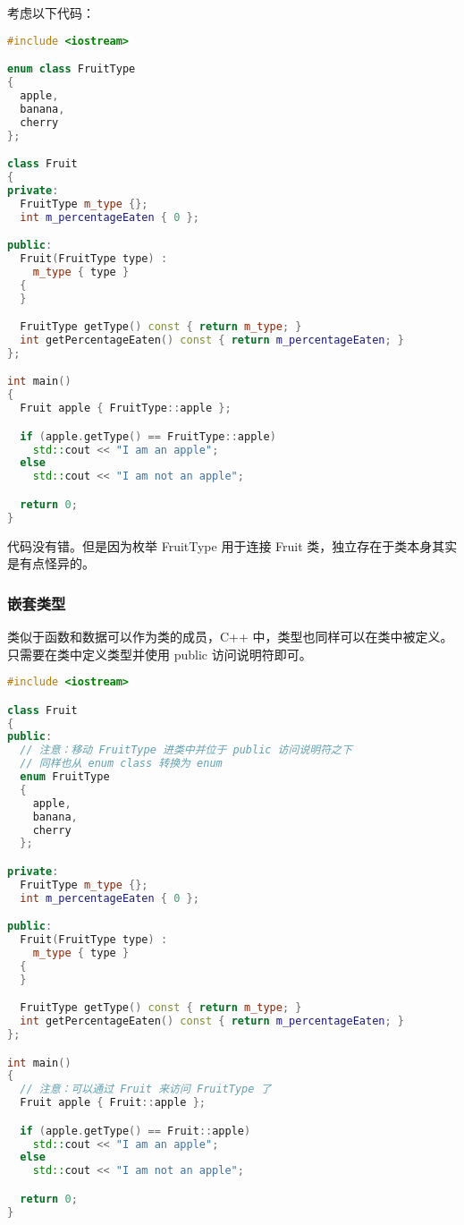 \documentclass[../../LearnCpp.tex]{subfiles}
\begin{document}

考虑以下代码：

\begin{lstlisting}[language=C++]
#include <iostream>

enum class FruitType
{
  apple,
  banana,
  cherry
};

class Fruit
{
private:
  FruitType m_type {};
  int m_percentageEaten { 0 };

public:
  Fruit(FruitType type) :
    m_type { type }
  {
  }

  FruitType getType() const { return m_type; }
  int getPercentageEaten() const { return m_percentageEaten; }
};

int main()
{
  Fruit apple { FruitType::apple };

  if (apple.getType() == FruitType::apple)
    std::cout << "I am an apple";
  else
    std::cout << "I am not an apple";

  return 0;
}
\end{lstlisting}

代码没有错。但是因为枚举 FruitType 用于连接 Fruit 类，独立存在于类本身其实是有点怪异的。

\subsubsection*{嵌套类型}

类似于函数和数据可以作为类的成员，C++ 中，类型也同样可以在类中被定义。
只需要在类中定义类型并使用 public 访问说明符即可。

\begin{lstlisting}[language=C++]
#include <iostream>

class Fruit
{
public:
  // 注意：移动 FruitType 进类中并位于 public 访问说明符之下
  // 同样也从 enum class 转换为 enum
  enum FruitType
  {
    apple,
    banana,
    cherry
  };

private:
  FruitType m_type {};
  int m_percentageEaten { 0 };

public:
  Fruit(FruitType type) :
    m_type { type }
  {
  }

  FruitType getType() const { return m_type; }
  int getPercentageEaten() const { return m_percentageEaten; }
};

int main()
{
  // 注意：可以通过 Fruit 来访问 FruitType 了
  Fruit apple { Fruit::apple };

  if (apple.getType() == Fruit::apple)
    std::cout << "I am an apple";
  else
    std::cout << "I am not an apple";

  return 0;
}
\end{lstlisting}
\end{document}
